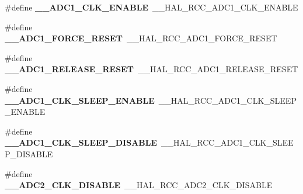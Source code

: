\begin{DoxyCompactItemize}
\item 
\hypertarget{group___h_a_l___r_c_c___aliased_ga9a9d5243d8f3d6747cfbb026fdf2e0b7}{\#define {\bfseries \-\_\-\-\_\-\-A\-D\-C1\-\_\-\-C\-L\-K\-\_\-\-E\-N\-A\-B\-L\-E}~\-\_\-\-\_\-\-H\-A\-L\-\_\-\-R\-C\-C\-\_\-\-A\-D\-C1\-\_\-\-C\-L\-K\-\_\-\-E\-N\-A\-B\-L\-E}\label{group___h_a_l___r_c_c___aliased_ga9a9d5243d8f3d6747cfbb026fdf2e0b7}

\item 
\hypertarget{group___h_a_l___r_c_c___aliased_ga74c96fb6dcb3e5ac23637040874f742a}{\#define {\bfseries \-\_\-\-\_\-\-A\-D\-C1\-\_\-\-F\-O\-R\-C\-E\-\_\-\-R\-E\-S\-E\-T}~\-\_\-\-\_\-\-H\-A\-L\-\_\-\-R\-C\-C\-\_\-\-A\-D\-C1\-\_\-\-F\-O\-R\-C\-E\-\_\-\-R\-E\-S\-E\-T}\label{group___h_a_l___r_c_c___aliased_ga74c96fb6dcb3e5ac23637040874f742a}

\item 
\hypertarget{group___h_a_l___r_c_c___aliased_ga58dc5da806adc545da8e62b986f6c4f4}{\#define {\bfseries \-\_\-\-\_\-\-A\-D\-C1\-\_\-\-R\-E\-L\-E\-A\-S\-E\-\_\-\-R\-E\-S\-E\-T}~\-\_\-\-\_\-\-H\-A\-L\-\_\-\-R\-C\-C\-\_\-\-A\-D\-C1\-\_\-\-R\-E\-L\-E\-A\-S\-E\-\_\-\-R\-E\-S\-E\-T}\label{group___h_a_l___r_c_c___aliased_ga58dc5da806adc545da8e62b986f6c4f4}

\item 
\hypertarget{group___h_a_l___r_c_c___aliased_ga9ce0348811aae0a082ef462e050bdbfa}{\#define {\bfseries \-\_\-\-\_\-\-A\-D\-C1\-\_\-\-C\-L\-K\-\_\-\-S\-L\-E\-E\-P\-\_\-\-E\-N\-A\-B\-L\-E}~\-\_\-\-\_\-\-H\-A\-L\-\_\-\-R\-C\-C\-\_\-\-A\-D\-C1\-\_\-\-C\-L\-K\-\_\-\-S\-L\-E\-E\-P\-\_\-\-E\-N\-A\-B\-L\-E}\label{group___h_a_l___r_c_c___aliased_ga9ce0348811aae0a082ef462e050bdbfa}

\item 
\hypertarget{group___h_a_l___r_c_c___aliased_gab6f5f7285730b9e581578c27eb407246}{\#define {\bfseries \-\_\-\-\_\-\-A\-D\-C1\-\_\-\-C\-L\-K\-\_\-\-S\-L\-E\-E\-P\-\_\-\-D\-I\-S\-A\-B\-L\-E}~\-\_\-\-\_\-\-H\-A\-L\-\_\-\-R\-C\-C\-\_\-\-A\-D\-C1\-\_\-\-C\-L\-K\-\_\-\-S\-L\-E\-E\-P\-\_\-\-D\-I\-S\-A\-B\-L\-E}\label{group___h_a_l___r_c_c___aliased_gab6f5f7285730b9e581578c27eb407246}

\item 
\hypertarget{group___h_a_l___r_c_c___aliased_gae27221f87c3db8c7e520cd404e530a49}{\#define {\bfseries \-\_\-\-\_\-\-A\-D\-C2\-\_\-\-C\-L\-K\-\_\-\-D\-I\-S\-A\-B\-L\-E}~\-\_\-\-\_\-\-H\-A\-L\-\_\-\-R\-C\-C\-\_\-\-A\-D\-C2\-\_\-\-C\-L\-K\-\_\-\-D\-I\-S\-A\-B\-L\-E}\label{group___h_a_l___r_c_c___aliased_gae27221f87c3db8c7e520cd404e530a49}


\end{DoxyCompactItemize}
